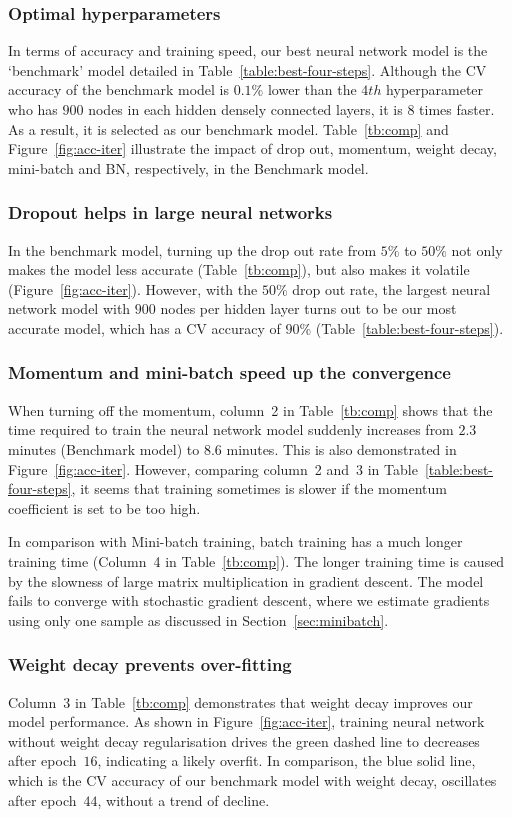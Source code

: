 \subsubsection{Optimal hyperparameters}
In terms of accuracy and training speed, our best neural network model is the `benchmark' model detailed in Table~\ref{table:best-four-steps}. Although the CV accuracy of the benchmark model is $0.1\%$ lower than the $4th$ hyperparameter who has $900$ nodes in each hidden densely connected layers, it is $8$ times faster. As a result, it is selected as our benchmark model. Table~\ref{tb:comp} and Figure~\ref{fig:acc-iter} illustrate the impact of drop out, momentum, weight decay, mini-batch and BN, respectively, in the Benchmark model.

\subsubsection{Dropout helps in large neural networks}
In the benchmark model, turning up the drop out rate from $5\%$ to $50\%$ not only makes the model less accurate (Table~\ref{tb:comp}), but also makes it volatile (Figure~\ref{fig:acc-iter}). However, with the $50\%$ drop out rate, the largest neural network model with $900$ nodes per hidden layer turns out to be our most accurate model, which has a CV accuracy of $90\%$ (Table~\ref{table:best-four-steps}). 

\subsubsection{Momentum and mini-batch speed up the convergence}
When turning off the momentum, column~2 in Table~\ref{tb:comp} shows that the time required to train the neural network model suddenly increases from $2.3$ minutes (Benchmark model) to $8.6$ minutes. This is also demonstrated in Figure~\ref{fig:acc-iter}. However, comparing column~2 and~3 in Table~\ref{table:best-four-steps}, it seems that  training sometimes is slower if the momentum coefficient is set to be too high.

In comparison with Mini-batch training, batch training has a much longer training time  (Column~4 in Table~\ref{tb:comp}). The longer training time is caused by the slowness of large matrix multiplication in gradient descent. The model fails to converge with stochastic gradient descent, where we estimate gradients using only one sample as discussed in Section~\ref{sec:minibatch}.

\subsubsection{Weight decay prevents over-fitting}
Column~3 in Table~\ref{tb:comp} demonstrates that weight decay improves our model performance. As shown in Figure~\ref{fig:acc-iter}, training neural network without weight decay regularisation drives the green dashed line to decreases after epoch~$16$, indicating a likely overfit. In comparison, the blue solid line, which is the CV accuracy of our benchmark model with weight decay, oscillates after epoch~$44$, without a trend of decline.


